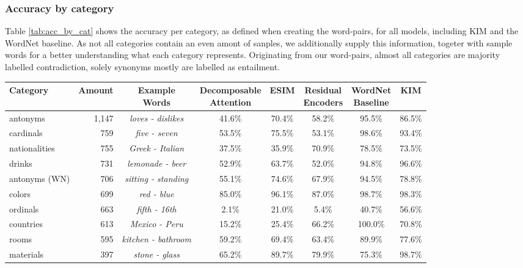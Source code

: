 \subsubsection{Accuracy by category}
Table \ref{tab:acc_by_cat} shows the accuracy per category, as defined when creating the word-pairs, for all models, including \ac{KIM} and the WordNet baseline. As not all categories contain an even amont of sanples, we additionally supply this information, togeter with sample words for a better understanding what each category represents. Originating from our word-pairs, almost all categories are majority labelled contradiction, solely synonyms mostly are labelled as entailment.
\begin{table}[tph!]
\centering
\begin{tabular}{lrc|ccccc} 
\toprule
\textbf{Category} & \textbf{Amount} & \specialcellc{\textbf{Example}\\\textbf{Words}} & \specialcellc{\textbf{Decomposable}\\\textbf{Attention}} & \textbf{ESIM} & \specialcellc{\textbf{Residual}\\\textbf{Encoders}} & \specialcellc{\textbf{WordNet}\\\textbf{Baseline}} & \textbf{KIM}  \\ \midrule
antonyms & 1,147 & \textit{loves - dislikes} & 41.6\% & 70.4\%& 58.2\% &  95.5\% & 86.5\% \\ 
cardinals & 759 &\textit{five - seven} & 53.5\% &75.5\% & 53.1\% & 98.6\% & 93.4\% \\ 
nationalities & 755 & \textit{Greek - Italian} & 37.5\% &35.9\% & 70.9\% & 78.5\% & 73.5\% \\ 
drinks & 731 & \textit{lemonade - beer} & 52.9\% &63.7\% & 52.0\% & 94.8\% & 96.6\% \\ 
antonyms (WN) & 706 & \textit{sitting - standing} & 55.1\% & 74.6\%& 67.9\% & 94.5\% & 78.8\% \\
colors & 699 & \textit{red - blue} & 85.0\% &96.1\% & 87.0\% & 98.7\% & 98.3\% \\ 
ordinals & 663 & \textit{fifth - 16th} & 2.1\% &21.0\% & 5.4\% &40.7\% & 56.6\% \\ 
countries & 613 & \textit{Mexico - Peru} & 15.2\% &25.4\% & 66.2\% & 100.0\% & 70.8\% \\ 
rooms & 595 & \textit{kitchen - bathroom} & 59.2\% &69.4\% & 63.4\% & 89.9\% & 77.6\% \\ 
materials & 397 & \textit{stone - glass} & 65.2\% & 89.7\%& 79.9\% & 75.3\% & 98.7\% \\

\end{tabular}
\end{table}
